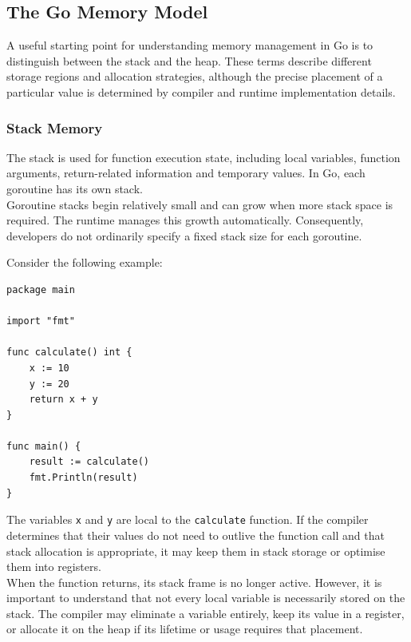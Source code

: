 \subsection{The Go Memory Model}

A useful starting point for understanding memory management in Go is to distinguish between the stack and the heap. These terms describe different storage regions and allocation strategies, although the precise placement of a particular value is determined by compiler and runtime implementation details.

\subsubsection{Stack Memory}

The stack is used for function execution state, including local variables, function arguments, return-related information and temporary values. In Go, each goroutine has its own stack.\\

Goroutine stacks begin relatively small and can grow when more stack space is required. The runtime manages this growth automatically. Consequently, developers do not ordinarily specify a fixed stack size for each goroutine.

Consider the following example:

\begin{lstlisting}
package main

import "fmt"

func calculate() int {
    x := 10
    y := 20
    return x + y
}

func main() {
    result := calculate()
    fmt.Println(result)
}
\end{lstlisting}

The variables \texttt{x} and \texttt{y} are local to the \texttt{calculate} function. If the compiler determines that their values do not need to outlive the function call and that stack allocation is appropriate, it may keep them in stack storage or optimise them into registers.\\

When the function returns, its stack frame is no longer active. However, it is important to understand that not every local variable is necessarily stored on the stack. The compiler may eliminate a variable entirely, keep its value in a register, or allocate it on the heap if its lifetime or usage requires that placement.\\

